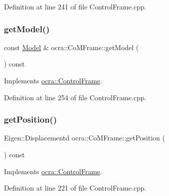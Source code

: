 Definition at line 241 of file Control\+Frame.\+cpp.

\hypertarget{classocra_1_1CoMFrame_afc280df9814e7eb2cf62f017f7bbfc2e}{}\label{classocra_1_1CoMFrame_afc280df9814e7eb2cf62f017f7bbfc2e} 
\subsubsection{\texorpdfstring{get\+Model()}{getModel()}}
{\footnotesize\ttfamily const \hyperlink{classocra_1_1Model}{Model} \& ocra\+::\+Co\+M\+Frame\+::get\+Model (\begin{DoxyParamCaption}{ }\end{DoxyParamCaption}) const\hspace{0.3cm}{\ttfamily [virtual]}}



Implements \hyperlink{classocra_1_1ControlFrame_ab8a1e5e3d96d7524112b4c88bf0bc5ee}{ocra\+::\+Control\+Frame}.



Definition at line 254 of file Control\+Frame.\+cpp.

\hypertarget{classocra_1_1CoMFrame_a809c05664b2e2abb489e930e27fbe2d4}{}\label{classocra_1_1CoMFrame_a809c05664b2e2abb489e930e27fbe2d4} 
\subsubsection{\texorpdfstring{get\+Position()}{getPosition()}}
{\footnotesize\ttfamily Eigen\+::\+Displacementd ocra\+::\+Co\+M\+Frame\+::get\+Position (\begin{DoxyParamCaption}{ }\end{DoxyParamCaption}) const\hspace{0.3cm}{\ttfamily [virtual]}}



Implements \hyperlink{classocra_1_1ControlFrame_aaadbbfbcdd5b8e197a0f181ffb2fdcbe}{ocra\+::\+Control\+Frame}.



Definition at line 221 of file Control\+Frame.\+cpp.

\hypertarget{classocra_1_1CoMFrame_a02be3e73c64903d67b1e7ada25c468c5}{}\label{classocra_1_1CoMFrame_a02be3e73c64903d67b1e7ada25c468c5} 
